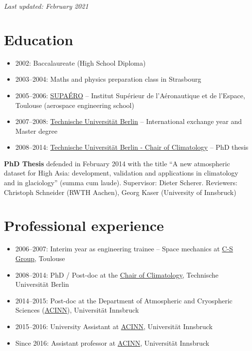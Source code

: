 \textit{Last updated: February 2021}


\section*{Education}
\label{\detokenize{ch08/cv:education}}\begin{itemize}[nosep]
\item {} 
2002: Baccalaureate (High School Diploma)

\item {} 
2003--2004: Maths and physics preparation class in Strasbourg

\item {} 
2005--2006: \href{https://www.isae-supaero.fr/en/}{SUPAÉRO} -- Institut Supérieur de l’Aéronautique et de l’Espace, Toulouse (aerospace engineering school)

\item {} 
2007--2008: \href{https://www.tu.berlin/}{Technische Universität Berlin} -- International exchange year and Master degree

\item {} 
2008--2014: \href{https://www.klima.tu-berlin.de}{Technische Universität Berlin - Chair of Climatology} -- PhD thesis

\end{itemize}

\textbf{PhD Thesis} defended in February 2014 with the title “A new atmospheric dataset for High Asia: development,
validation and applications in climatology and in glaciology” (summa cum laude). 
Supervisor: Dieter Scherer. Reviewers: Christoph Schneider (RWTH Aachen), Georg Kaser (University of Innsbruck)


\section*{Professional experience}
\label{\detokenize{ch08/cv:professional-experience}}\begin{itemize}
\item {} 
2006--2007: Interim year as engineering trainee -- Space mechanics at \href{https://www.c-s.fr}{C-S Group}, Toulouse

\item {} 
2008--2014: PhD / Post-doc at the \href{http://klima.tu-berlin.de}{Chair of Climatology}, Technische Universität Berlin

\item {} 
2014--2015: Post-doc at the Department of Atmospheric and Cryospheric Sciences (\href{https://www.uibk.ac.at/acinn}{ACINN}), Universität Innsbruck

\item {} 
2015--2016: University Assistant at \href{https://www.uibk.ac.at/acinn}{ACINN}, Universität Innsbruck

\item {} 
Since 2016: Assistant professor at \href{https://www.uibk.ac.at/acinn}{ACINN}, Universität Innsbruck

\end{itemize}


